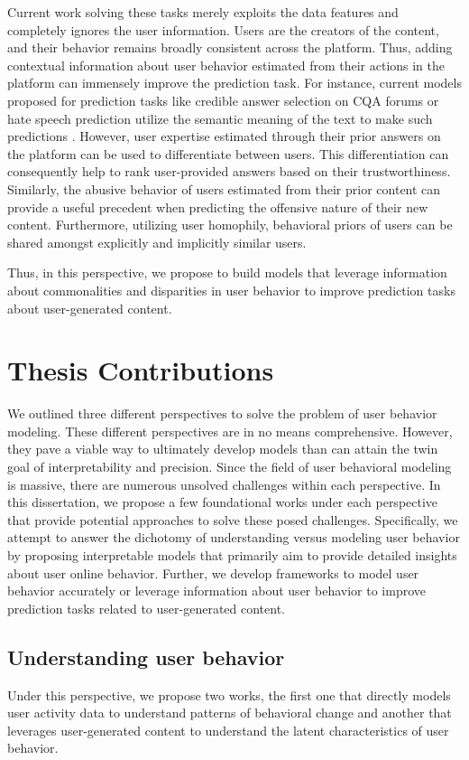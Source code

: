 Current work solving these tasks merely exploits the data features and completely ignores the user information. Users are the creators of the content, and their behavior remains broadly consistent across the platform. Thus, adding contextual information about user behavior estimated from their actions in the platform can immensely improve the prediction task.
For instance, current models proposed for prediction tasks like credible answer selection on CQA forums or hate speech prediction utilize the semantic meaning of the text to make such predictions \cite{zhang2018texttruth, elsherief2018hate}. However, user expertise estimated through their prior answers on the platform can be used to differentiate between users. This differentiation can consequently help to rank user-provided answers based on their trustworthiness.
Similarly, the abusive behavior of users estimated from their prior content can provide a useful precedent when predicting the offensive nature of their new content. Furthermore, utilizing user homophily, behavioral priors of users can be shared amongst explicitly and implicitly similar users.

Thus, in this perspective, we propose to build models that leverage information about commonalities and disparities in user behavior to improve prediction tasks about user-generated content.

\noindent
\section{Thesis Contributions}
We outlined three different perspectives to solve the problem of user behavior modeling.
These different perspectives are in no means comprehensive. However, they pave a viable way to ultimately develop models than can attain the twin goal of interpretability and precision.
Since the field of user behavioral modeling is massive, there are numerous unsolved challenges within each perspective. In this dissertation, we propose a few foundational works under each perspective that provide potential approaches to solve these posed challenges.
Specifically, we attempt to answer the dichotomy of understanding versus modeling user behavior by proposing interpretable models that primarily aim to provide detailed insights about user online behavior. Further, we develop frameworks to model user behavior accurately or leverage information about user behavior to improve prediction tasks related to user-generated content.

\subsection{Understanding user behavior}
Under this perspective, we propose two works, the first one that directly models user activity data to understand patterns of behavioral change and another that leverages user-generated content to understand the latent characteristics of user behavior.

